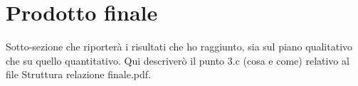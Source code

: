 \section{Prodotto finale}

Sotto-sezione che riporterà i risultati che ho raggiunto, sia sul piano qualitativo che su quello quantitativo.
Qui descriverò il punto 3.c (cosa e come) relativo al file Struttura relazione finale.pdf.